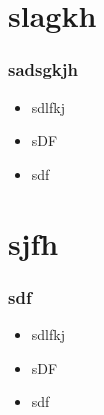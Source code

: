 \documentclass{beamer}
\begin{document}
\section{slagkh}
\begin{frame}
    \frametitle{sadsgkjh}
    \begin{itemize}
        \item sdlfkj
        \item sDF
        \item sdf
    \end{itemize}
\end{frame}
\section{sjfh}
\begin{frame}
    \frametitle{sdf}
    \begin{itemize}
        \item sdlfkj
        \item sDF
        \item sdf
    \end{itemize}
\end{frame}
\end{document}
